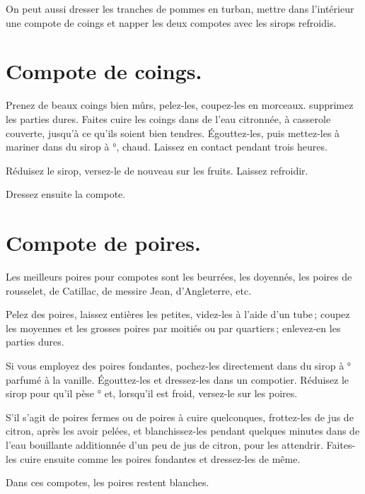 \sk

On peut aussi dresser les tranches de pommes en turban, mettre dans l’intérieur
une compote de coings et napper les deux compotes avec les sirops refroidis.

\section*{\centering Compote de coings.}
{}

Prenez de beaux coings bien mûrs, pelez-les, coupez-les en morceaux. supprimez
les parties dures. Faites cuire les coings dans de l'eau citronnée, à casserole
couverte, jusqu'à ce qu'ils soient bien tendres. Égouttez-les, puis mettez-les
à mariner dans du sirop à {\mmm}°, chaud. Laissez en contact pendant
trois heures.

Réduisez le sirop, versez-le de nouveau sur les fruits. Laissez refroidir.

Dressez ensuite la compote.

\section*{\centering Compote de poires.}
{}

Les meilleurs poires pour compotes sont les beurrées, les doyennés, les poires
de rousselet, de Catillac, de messire Jean, d'Angleterre, etc.

Pelez des poires, laissez entières les petites, videz-les à l’aide d'un tube ;
coupez les moyennes et les grosses poires par moitiés ou par quartiers ;
enlevez-en les parties dures.

Si vous employez des poires fondantes, pochez-les directement dans du sirop
à {\mmm}° parfumé à la vanille. Égouttez-les et dressez-les dans un
compotier. Réduisez le sirop pour qu'il pèse {\mmm}° et, lorsqu'il est
froid, versez-le sur les poires.

S'il s'agit de poires fermes ou de poires à cuire quelconques, frottez-les de
jus de citron, après les avoir pelées, et blanchissez-les pendant quelques
minutes dans de l'eau bouillante additionnée d'un peu de jus de citron, pour
les attendrir. Faites-les cuire ensuite comme les poires fondantes et
dressez-les de même.

Dans ces compotes, les poires restent blanches.

